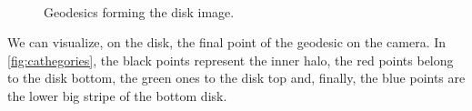 \begin{figure}[bth]
	\myfloatalign
	 \quad
	 \\
	 \quad
	\caption[Geodesics forming the disk image.]{Geodesics forming the disk image.}\label{fig:geodesicsdisk}
\end{figure}

We can visualize, on the disk, the final point of the geodesic on the camera. In \autoref{fig:cathegories}, the black points represent the inner halo, the red points belong to the disk bottom, the green ones to the disk top and, finally, the blue points are the lower big stripe of the bottom disk.


